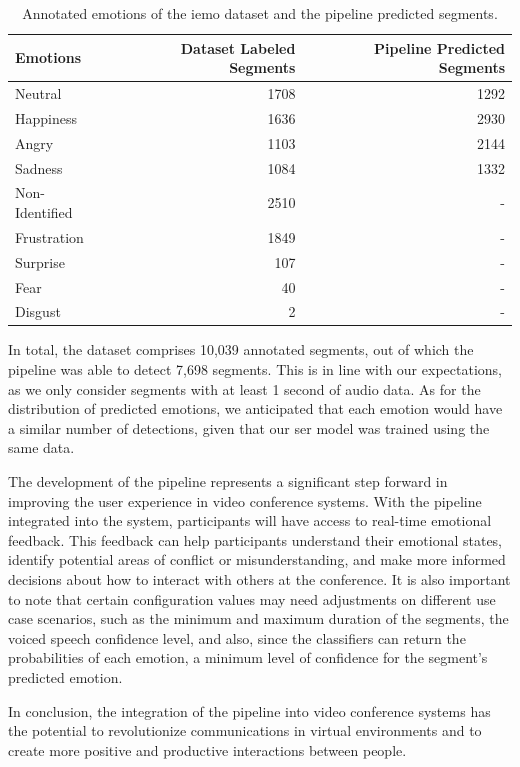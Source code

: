 \begin{table}[H]
	\centering
	\label{table:iemo_pipeline}
	\caption{Annotated emotions of the \ac{iemo} dataset and the pipeline predicted segments.}
	\begin{tabular}{lrr}
		\toprule
		Emotions & Dataset Labeled Segments & Pipeline Predicted Segments \\
		\midrule
		Neutral & 1708 & 1292 \\
		Happiness & 1636 & 2930 \\
		Angry & 1103 & 2144 \\
		Sadness & 1084 & 1332 \\
		Non-Identified & 2510 & - \\
		Frustration & 1849 & - \\
		Surprise	& 107 & - \\
		Fear & 40 & - \\
		Disgust & 2 & - \\
		\bottomrule
	\end{tabular}
\end{table}

In total, the dataset comprises 10,039 annotated segments, out of which the pipeline was able to detect 7,698 segments. This is in line with our expectations, as we only consider segments with at least 1 second of audio data. As for the distribution of predicted emotions, we anticipated that each emotion would have a similar number of detections, given that our \ac{ser} model was trained using the same data.

The development of the pipeline represents a significant step forward in improving the user experience in video conference systems. With the pipeline integrated into the system, participants will have access to real-time emotional feedback. This feedback can help participants understand their emotional states, identify potential areas of conflict or misunderstanding, and make more informed decisions about how to interact with others at the conference. It is also important to note that certain configuration values may need adjustments on different use case scenarios, such as the minimum and maximum duration of the segments, the voiced speech confidence level, and also, since the classifiers can return the probabilities of each emotion, a minimum level of confidence for the segment's predicted emotion.

In conclusion, the integration of the pipeline into video conference systems has the potential to revolutionize communications in virtual environments and to create more positive and productive interactions between people.
